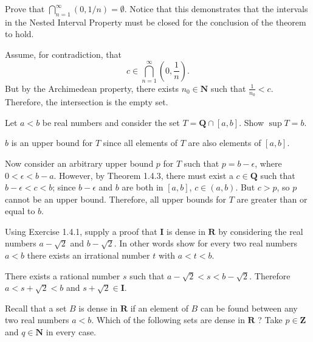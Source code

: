 \begin{exercise}
  Prove that $\bigcap_{n=1}^{\infty}(0,1 / n)=\emptyset$. Notice that this demonstrates that the intervals in the Nested Interval Property must be closed for the conclusion of the theorem to hold.
\end{exercise}

\begin{solution}
  Assume, for contradiction, that $$c\in\bigcap^\infty_{n=1} \left( 0, \frac{1}{n}\right).$$ But by the Archimedean property, there exists $n_0\in\mathbf{N}$ such that $\frac{1}{n_0}<c$. Therefore, the intersection is the empty set.
\end{solution}


\begin{exercise}
  Let $a<b$ be real numbers and consider the set $T=\mathbf{Q} \cap[a, b]$. Show $\sup T=b$.
\end{exercise}

\begin{solution}
  $b$ is an upper bound for $T$ since all elements of $T$ are also elements of $[a, b]$.

  Now consider an arbitrary upper bound $p$ for $T$ such that $p=b-\epsilon$, where $0<\epsilon<b-a$. However, by Theorem 1.4.3, there must exist a $c\in\mathbf{Q}$ such that $b-\epsilon<c<b$; since $b-\epsilon$ and $b$ are both in $[a,b]$, $c\in (a, b)$. But $c>p$, so $p$ cannot be an upper bound. Therefore, all upper bounds for $T$ are greater than or equal to $b$.
\end{solution}

\begin{exercise}
  Using Exercise 1.4.1, supply a proof that $\mathbf{I}$ is dense in $\mathbf{R}$ by considering the real numbers $a-\sqrt{2}$ and $b-\sqrt{2}$. In other words show for every two real numbers $a<b$ there exists an irrational number $t$ with $a<t<b$.
\end{exercise}

\begin{solution}
  There exists a rational number $s$ such that $a-\sqrt2 <s<b-\sqrt2$. Therefore $a<s+\sqrt2 <b$ and $s+\sqrt2 \in \mathbf{I}$.
\end{solution}

\begin{exercise}
  Recall that a set $B$ is dense in $\mathbf{R}$ if an element of $B$ can be found between any two real numbers $a<b$. Which of the following sets are dense in $\mathbf{R}$ ? Take $p \in \mathbf{Z}$ and $q \in \mathbf{N}$ in every case.
\end{exercise}

